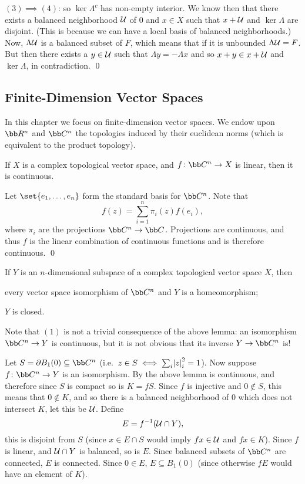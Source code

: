    $(3)\implies(4)$: so $\ker\Lambda^c$ has non-empty interior.
    We know then that there exists a balanced neighborhood ${\cal U}$ of $0$ and $x\in X$ such that $x+{\cal U}$ and $\ker\Lambda$ are disjoint.
    (This is because we can have a local basis of balanced neighborhoods.)
    Now, $\Lambda{\cal U}$ is a balanced subset of $F$, which means that if it is unbounded $\Lambda{\cal U}=F$.
    But then there exists a $y\in{\cal U}$ such that $\Lambda y=-\Lambda x$ and so $x+y\in x+{\cal U}$ and $\ker\Lambda$, in contradiction.
    \qed

\eproof

\subsection{Finite-Dimension Vector Spaces}

In this chapter we focus on finite-dimension vector spaces.
We endow upon $\bb R^n$ and $\bb C^n$ the topologies induced by their euclidean norms (which is equivalent to the product topology).

\blemm

    If $X$ is a complex topological vector space, and $f\colon\bb C^n\to X$ is linear, then it is continuous.

\elemm

\bproof

    Let $\set{e_1,\dots,e_n}$ form the standard basis for $\bb C^n$.
    Note that
    $$ f(z) = \sum_{i=1}^n\pi_i(z)f(e_i) , $$
    where $\pi_i$ are the projections $\bb C^n\to\bb C$.
    Projections are continuous, and thus $f$ is the linear combination of continuous functions and is therefore continuous.
    \qed

\eproof

\bthrm

    If $Y$ is an $n$-dimensional subspace of a complex topological vector space $X$, then
    \benum
        \item every vector space isomorphism of $\bb C^n$ and $Y$ is a homeomorphism;
        \item $Y$ is closed.
    \eenum

\ethrm

Note that $(1)$ is not a trivial consequence of the above lemma: an isomorphism $\bb C^n\to Y$ is continuous, but it is not obvious that its inverse $Y\to\bb C^n$ is!

\bproof

    Let $S=\partial B_1(0)\subseteq\bb C^n$ (i.e.\ $z\in S\iff\sum_i\mathopen{}\mathclose{\left|z\right|}_i^2=1$).
    Now suppose $f\colon\bb C^n\to Y$ is an isomorphism.
    By the above lemma is continuous, and therefore since $S$ is compact so is $K=fS$.
    Since $f$ is injective and $0\notin S$, this means that $0\notin K$, and so there is a balanced neighborhood of $0$ which does not intersect $K$, let this be ${\cal U}$.
    Define
    $$ E = f^{-1}({\cal U}\cap Y) , $$
    this is disjoint from $S$ (since $x\in E\cap S$ would imply $fx\in{\cal U}$ and $fx\in K$).
    Since $f$ is linear, and ${\cal U}\cap Y$ is balanced, so is $E$.
    Since balanced subsets of $\bb C^n$ are connected, $E$ is connected.
    Since $0\in E$, $E\subseteq B_1(0)$ (since otherwise $fE$ would have an element of $K$).

